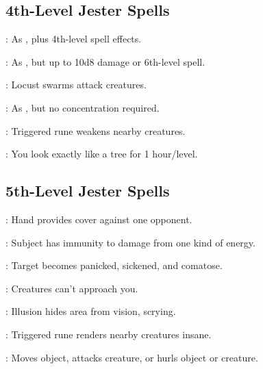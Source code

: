 \begin{multicols}{2}
\subsection{4th-Level Jester Spells}
\begin{description*}
\item[\linkspell{Globe of Invulnerability}:] As , plus 4th-level spell effects.
\item[\linkspell{Glyph of Warding, Greater}:] As , but up to 10d8 damage or 6th-level spell.
\item[\linkspell{Insect Plague}:] Locust swarms attack creatures.
\item[\linkspell{Persistent Image}:] As , but no concentration required.
\item[\linkspell{Symbol of Weakness}:] Triggered rune weakens nearby creatures.
\item[\linkspell{Tree Shape}:] You look exactly like a tree for 1 hour/level.
\end{description*}

\subsection{5th-Level Jester Spells}
\begin{description*}
\item[\linkspell{Bigby’s Interposing Hand}:] Hand provides cover against one opponent.
\item[\linkspell{Energy Immunity}:] Subject has immunity to damage from one kind of energy.
\item[\linkspell{Eyebite}:] Target becomes panicked, sickened, and comatose.
\item[\linkspell{Repulsion}:] Creatures can’t approach you.
\item[\linkspell{Screen}:] Illusion hides area from vision, scrying.
\item[\linkspell{Symbol of Insanity}:] Triggered rune renders nearby creatures insane.
\item[\linkspell{Telekinesis}:] Moves object, attacks creature, or hurls object or creature.
\end{description*}


\end{multicols}
